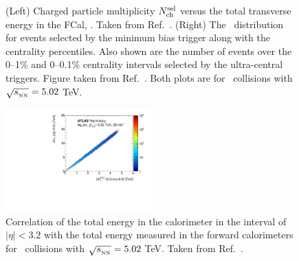 \begin{figure}
\begin{subfigure}{.45\textwidth}
          \caption{}
          \label{fig:fcal_distr}
\end{subfigure}
\caption{(Left) Charged particle multiplicity $N_{\rm ch}^{\rm sel}$ versus the total transverse energy in the FCal, \ETfcal.
Taken from Ref.~\cite{perfPlots}.
(Right) The \ETfcal\ distribution for events selected by the minimum bias trigger along with the centrality percentiles.
Also shown are the number of events over the 0--1\% and 0--0.1\% centrality intervals selected by the ultra-central triggers.
Figure taken from Ref.~\cite{Aaboud:2018ves}.
Both plots are for \pbpb\ collisions with $\mbox{$\sqrt{s_{_\text{NN}}}$} = 5.02$ TeV.}
\label{}
\end{figure}


\begin{figure}[ht]
	\centering
        \includegraphics[width=0.5\textwidth]{figures/setup/fcal_barrel}
          \caption{Correlation of the total energy in the calorimeter in the interval of $|\eta| < 3.2$ with the total energy measured in the forward calorimeters for \pbpb\ collisions with $\mbox{$\sqrt{s_{_\text{NN}}}$} = 5.02$ TeV.
          Taken from Ref.~\cite{perfPlots}.}
          \label{fig:fcal_barrel}
\end{figure}


